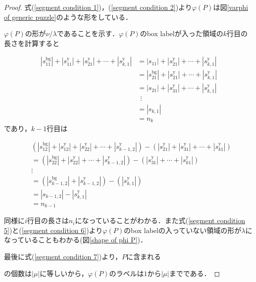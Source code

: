 \begin{proof}
  式(\ref{segment condition 1})，(\ref{segment condition 2})より$\varphi(P)$は図\ref{varphi of generic puzzle}のような形をしている．
  

  $\varphi(P)$の形が$\nu/\lambda$であることを示す．$\varphi(P)$のbox labelが入った領域の$k$行目の長さを計算すると

  \begin{align*}
    |s_{11}^{\text{bg}}| + |s_{11}^{\text{y}}| + |s_{21}^{\text{y}}| + \cdots + |s_{k,1}^{\text{y}}|
    &=|s_{11}| + |s_{21}^{\text{y}}| + \cdots + |s_{k,1}^{\text{y}}|\\
    &=|s_{21}^{\text{bg}}| + |s_{21}^{\text{y}}| + \cdots + |s_{k,1}^{\text{y}}|\\
    &=|s_{21}| + |s_{31}^{\text{y}}| + \cdots + |s_{k,1}^{\text{y}}|\\
    &\:\:\vdots\\
    &=|s_{k,1}|\\
    &=n_k
  \end{align*}
  であり，$k-1$行目は

  \begin{align*}
    &(|s_{12}^{\text{bg}}| + |s_{12}^{\text{y}}| + |s_{22}^{\text{y}}| + \cdots + |s_{k-1,2}^{\text{y}}|)
    - (|s_{21}^{\text{y}}|+|s_{31}^{\text{y}}|+\cdots+|s_{k1}^{\text{y}}|)\\
    &=(|s_{22}^{\text{bg}}| + |s_{22}^{\text{y}}| + \cdots + |s_{k-1,2}^{\text{y}}|) - (|s_{31}^{\text{y}}|+\cdots+|s_{k1}^{\text{y}}|)\\
    &\vdots\\
    &=(|s_{k-1,2}^{\text{bg}}|+|s_{k-1,2}^{\text{y}}|)-(|s_{k,1}^{\text{y}}|)\\
    &=|s_{k-1,2}| - |s_{k,1}^{\text{y}}|\\
    &=n_{k-1}
  \end{align*}

  同様に$i$行目の長さは$n_{i}$になっていることがわかる．また式(\ref{segment condition 5})と(\ref{segment condition 6})より$\varphi(P)$のbox labelの入っていない領域の形が$\lambda$になっていることもわかる(図\ref{shape of phi P})．
  

  最後に式(\ref{segment condition 7})より，$P$に含まれる
  の個数は$|\mu|$に等しいから，$\varphi(P)$のラベルは$1$から$|\mu|$までである．
\end{proof}

